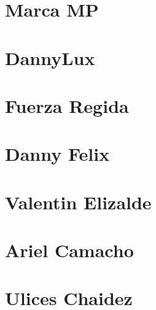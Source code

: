 \documentclass{article}
\begin{document}
\section{Marca MP}


\section{DannyLux}


\section{Fuerza Regida}







\section{Danny Felix}

\section{Valentin Elizalde}


\section{Ariel Camacho}



\section{Ulices Chaidez}

\end{document}
